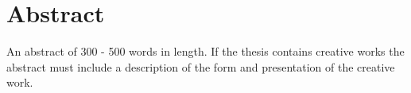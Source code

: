 {}

\begingroup

\let\clearpage\relax
\let\cleardoublepage\relax
\let\cleardoublepage\relax

\chapter*{Abstract}

An abstract of 300 - 500 words in length. If the thesis contains creative works the abstract must include a description of the form and presentation of the creative work.

\vfill

\endgroup

\vfill
